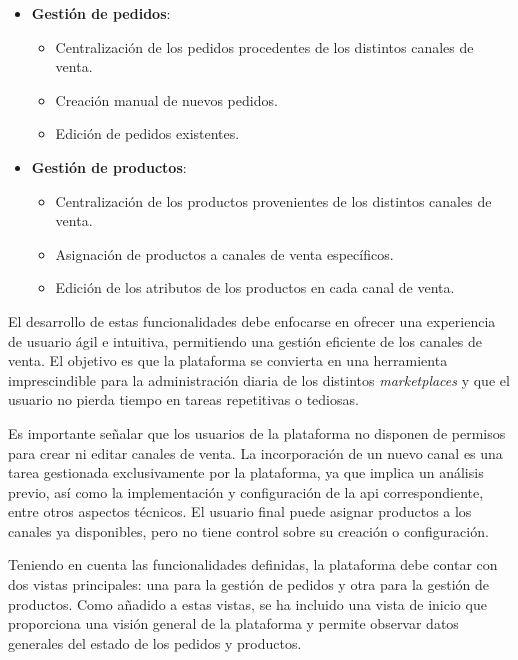 \begin{itemize}
    \item \textbf{Gestión de pedidos}:
          \begin{itemize}
              \item Centralización de los pedidos procedentes de los distintos canales de venta.
              \item Creación manual de nuevos pedidos.
              \item Edición de pedidos existentes.
          \end{itemize}
    \item \textbf{Gestión de productos}:
          \begin{itemize}
              \item Centralización de los productos provenientes de los distintos canales de venta.
              \item Asignación de productos a canales de venta específicos.
              \item Edición de los atributos de los productos en cada canal de venta.
          \end{itemize}
\end{itemize}

El desarrollo de estas funcionalidades debe enfocarse en ofrecer una experiencia de usuario ágil e intuitiva, permitiendo una gestión eficiente de los canales de venta. El objetivo es que la plataforma se convierta en una herramienta imprescindible para la administración diaria de los distintos \textit{marketplaces} y que el usuario no pierda tiempo en tareas repetitivas o tediosas.

Es importante señalar que los usuarios de la plataforma no disponen de permisos para crear ni editar canales de venta. La incorporación de un nuevo canal es una tarea gestionada exclusivamente por la plataforma, ya que implica un análisis previo, así como la implementación y configuración de la \gls{api} correspondiente, entre otros aspectos técnicos. El usuario final puede asignar productos a los canales ya disponibles, pero no tiene control sobre su creación o configuración.

Teniendo en cuenta las funcionalidades definidas, la plataforma debe contar con dos vistas principales: una para la gestión de pedidos y otra para la gestión de productos. Como añadido a estas vistas, se ha incluido una vista de inicio que proporciona una visión general de la plataforma y permite observar datos generales del estado de los pedidos y productos.

